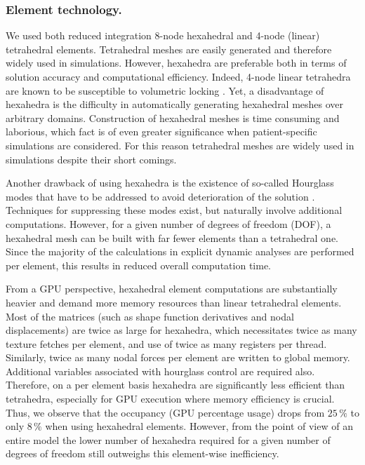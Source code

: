 \subsubsection*{Element technology.}
We used both reduced integration 8-node hexahedral and 4-node (linear) tetrahedral elements. Tetrahedral meshes are easily generated and therefore widely used in simulations. However, hexahedra are preferable both in terms of solution accuracy and computational efficiency. Indeed, 4-node linear tetrahedra are known to be susceptible to volumetric locking \citep{Hughes00}.  Yet, a disadvantage of hexahedra is the difficulty in automatically generating hexahedral meshes over arbitrary domains. Construction of hexahedral meshes is time consuming and laborious, which fact is of even greater significance when patient-specific simulations are considered. For this reason tetrahedral meshes are widely used in simulations despite their short comings. 

Another drawback of using hexahedra is the existence of so-called Hourglass modes that have to be addressed to avoid deterioration of the solution \citep{Flanagan81}. Techniques for suppressing these modes exist, but naturally involve additional computations. However, for a given number of degrees of freedom (DOF), a hexahedral mesh can be built with far fewer elements than a tetrahedral one. Since the majority of the calculations in explicit dynamic analyses are performed per element, this results in reduced overall computation time.

From a GPU perspective, hexahedral element computations are substantially heavier and demand more memory resources than linear tetrahedral elements. Most of the matrices (such as shape function derivatives and nodal displacements) are twice as large for hexahedra, which necessitates twice as many texture fetches per element, and use of twice as many registers per thread. Similarly, twice as many nodal forces per element are written to global memory. Additional variables associated with hourglass control are required also. Therefore, on a per element basis hexahedra are significantly less efficient than tetrahedra, especially for GPU execution where memory efficiency is crucial. Thus, we observe that the occupancy (GPU percentage usage) drops from $25\,\%$ to only $8\,\%$ when using hexahedral elements. However, from the point of view of an entire model the lower number of hexahedra required for a given number of degrees of freedom still outweighs this element-wise inefficiency.


